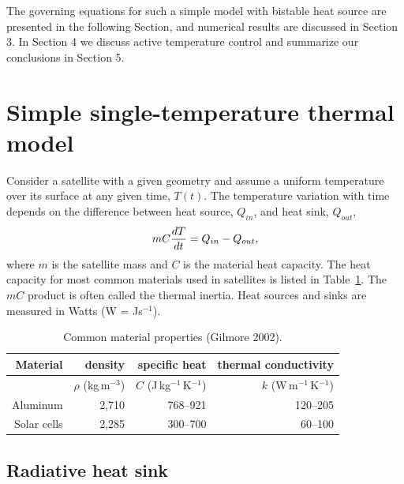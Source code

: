 \documentclass[]{aastex62}
\def\eq#1{\begin{equation} #1 \end{equation}}
\begin{document}
The governing equations for such a simple model with bistable heat source are presented in the 
following Section, and numerical results are discussed in Section 3.  In Section 4 we discuss
active temperature control and summarize our conclusions in Section 5. 


\section{Simple single-temperature thermal model} 

Consider a satellite with a given geometry and assume a uniform temperature over its surface
at any given time, $T(t)$. The temperature variation with time depends on the difference between
heat source, $Q_{in}$, and heat sink, $Q_{out}$, 
\eq{
\label{eq:dTdt}
                 m C {dT \over dt} =  Q_{in} - Q_{out}, 
}
where $m$ is the satellite mass and $C$ is the material heat capacity. The heat capacity for 
most common materials used in satellites is listed in Table~\ref{tab:inputsMatProp}. 
The $mC$ product is often called the thermal inertia. Heat sources and sinks are measured in 
Watts (W = Js$^{-1}$). 

\begin{table}[ht!]
	\centering
	\caption{Common material properties (Gilmore 2002). }
	\label{tab:inputsMatProp}
	\begin{tabular}{r|r|r|r} %
		\hline
  	        Material    &      density &   specific heat & thermal conductivity \\
		\hline
                 \phantom{x}              & $\rho$ (kg\,m$^{-3}$)   &   $C$ (J\,kg$^{-1}$\,K$^{-1}$)  & $k$ (W\,m$^{-1}$\,K$^{-1}$)  \\
             Aluminum  &       2,710       &         768--921      &     120--205  \\ 
             Solar cells  &       2,285       &         300--700      &     60--100    \\
 		\hline
	\end{tabular} 
\end{table}
 
\subsection{Radiative heat sink} 
\end{document}
